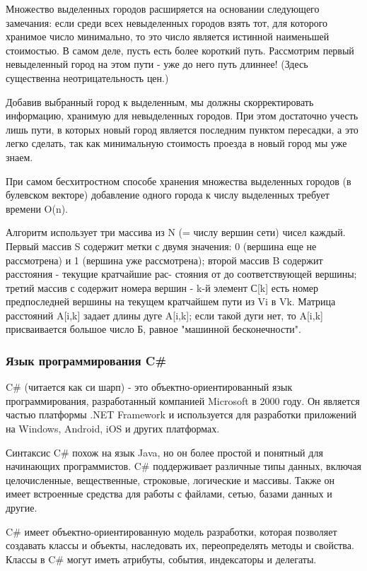 \documentclass[a4paper,14pt, Times New Roman]{extarticle}
\begin{document}
Множество выделенных городов расширяется на основании следующего замечания: если среди всех невыделенных городов взять тот, для которого хранимое число минимально, то это число является истинной наименьшей стоимостью. В самом деле, пусть есть более короткий путь. Рассмотрим первый невыделенный город на этом пути - уже до него путь длиннее! (Здесь существенна неотрицательность цен.)

Добавив выбранный город к выделенным, мы должны скорректировать информацию, хранимую для невыделенных городов. При этом достаточно учесть лишь пути, в которых новый город является последним пунктом пересадки, а это легко сделать, так как минимальную стоимость проезда в новый город мы уже знаем.

При самом бесхитростном способе хранения множества выделенных городов (в булевском векторе) добавление одного города к числу выделенных требует времени O(n).

Алгоритм использует три массива из N (= числу вершин сети) чисел каждый. Первый массив S содержит метки с двумя значения: 0 (вершина еще не рассмотрена) и 1 (вершина уже рассмотрена); второй массив B содержит расстояния - текущие кратчайшие рас- стояния от до соответствующей вершины; третий массив с содержит номера вершин - k-й элемент С[k] есть номер предпоследней вершины на текущем кратчайшем пути из Vi в Vk. Матрица расстояний A[i,k] задает длины дуге A[i,k]; если такой дуги нет, то A[i,k] присваивается большое число Б, равное "машинной бесконечности".

\subsubsection{Язык программирования C\#}

C\# (читается как си шарп) - это объектно-ориентированный язык программирования, разработанный компанией Microsoft в 2000 году. Он является частью платформы .NET Framework и используется для разработки приложений на Windows, Android, iOS и других платформах.

Синтаксис C\# похож на язык Java, но он более простой и понятный для начинающих программистов. C\# поддерживает различные типы данных, включая целочисленные, вещественные, строковые, логические и массивы. Также он имеет встроенные средства для работы с файлами, сетью, базами данных и другие.

C\# имеет объектно-ориентированную модель разработки, которая позволяет создавать классы и объекты, наследовать их, переопределять методы и свойства. Классы в C\# могут иметь атрибуты, события, индексаторы и делегаты.
\end{document}
